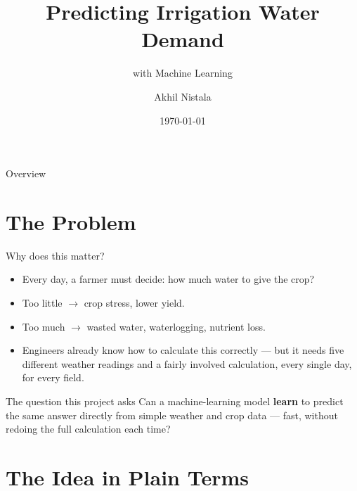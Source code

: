 \documentclass[11pt,aspectratio=169]{beamer}
\title{Predicting Irrigation Water Demand}
\subtitle{with Machine Learning}
\author{Akhil Nistala}
\institute{Civil Engineering (Water Resources Engineering) Term Project \\ IIT Hyderabad}
\date{\today}
\begin{document}
{
\begin{frame}
  \titlepage
\end{frame}
}

\begin{frame}{Overview}
  \tableofcontents
\end{frame}

\section{The Problem}

\begin{frame}{Why does this matter?}
  \begin{itemize}
    \item Every day, a farmer must decide: \alert{how much water to give the crop?}
    \item Too little $\rightarrow$ crop stress, lower yield.
    \item Too much $\rightarrow$ wasted water, waterlogging, nutrient loss.
    \item Engineers already know how to calculate this correctly --- but it needs
      five different weather readings and a fairly involved calculation, every
      single day, for every field.
  \end{itemize}
  \begin{alertblock}{The question this project asks}
    Can a machine-learning model \textbf{learn} to predict the same answer directly
    from simple weather and crop data --- fast, without redoing the full
    calculation each time?
  \end{alertblock}
\end{frame}

\section{The Idea in Plain Terms}
\end{document}
